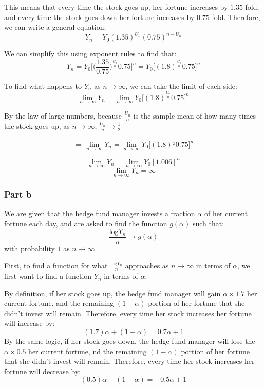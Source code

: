 \documentclass{article}
\begin{document}
This means that every time the stock goes up, her fortune increases by $1.35$ fold, and every time the stock goes down her fortune increases by $0.75$ fold. Therefore, we can write a general equation:
$$Y_{n} = Y_{0}(1.35)^{U_{n}}(0.75)^{n - U_{n}}$$

We can simplify this using exponent rules to find that:
$$Y_{n} = Y_{0}\bigg[\bigg(\frac{1.35}{0.75}\bigg)^{\frac{U_{n}}{n}}0.75\bigg]^{n} = Y_{0}\bigg[(1.8)^{\frac{U_{n}}{n}}0.75\bigg]^{n}$$

To find what happens to $Y_{n}$ as $n \rightarrow \infty$, we can take the limit of each side:
$$\lim_{n \rightarrow \infty}Y_{n} = \lim_{n \rightarrow \infty} Y_{0}\bigg[(1.8)^{\frac{U_{n}}{n}}0.75\bigg]^{n}$$

By the law of large numbers, because $\frac{U_{n}}{n}$ is the sample mean of how many times the stock goes up, as $n \rightarrow \infty$, $\frac{U_{n}}{n} \rightarrow \frac{1}{2}$

$$\Rightarrow \lim_{n \rightarrow \infty}Y_{n} = \lim_{n \rightarrow \infty} Y_{0}\bigg[(1.8)^{\frac{1}{2}}0.75\bigg]^{n}$$

$$\lim_{n \rightarrow \infty}Y_{n} = \lim_{n \rightarrow \infty} Y_{0}[1.006]^{n}$$
$$\lim_{n \rightarrow \infty}Y_{n} = \infty$$

\subsubsection{Part b}
We are given that the hedge fund manager invests a fraction $\alpha$ of her current fortune each day, and are asked to find the function $g(\alpha)$ such that:
$$\frac{\text{log}Y_{n}}{n} \rightarrow g(\alpha)$$
with probability $1$ as $n \rightarrow \infty$.

First, to find a function for what $\frac{\text{log}Y_{n}}{n}$ approaches as $n \rightarrow \infty$ in terms of $\alpha$, we first want to find a function $Y_{n}$ in terms of $\alpha$.

By definition, if her stock goes up, the hedge fund manager will gain $\alpha \times 1.7$ her current fortune, and the remaining $(1 - \alpha)$ portion of her fortune that she didn't invest will remain. Therefore, every time her stock increases her fortune will increase by:
$$(1.7)\alpha + (1 - \alpha) = 0.7\alpha + 1$$
By the same logic, if her stock goes down, the hedge fund manager will lose the $\alpha \times 0.5$ her current fortune, nd the remaining $(1 - \alpha)$ portion of her fortune that she didn't invest will remain. Therefore, every time her stock increases her fortune will decrease by:
$$(0.5)\alpha + (1 - \alpha) = -0.5\alpha + 1$$
\end{document}
